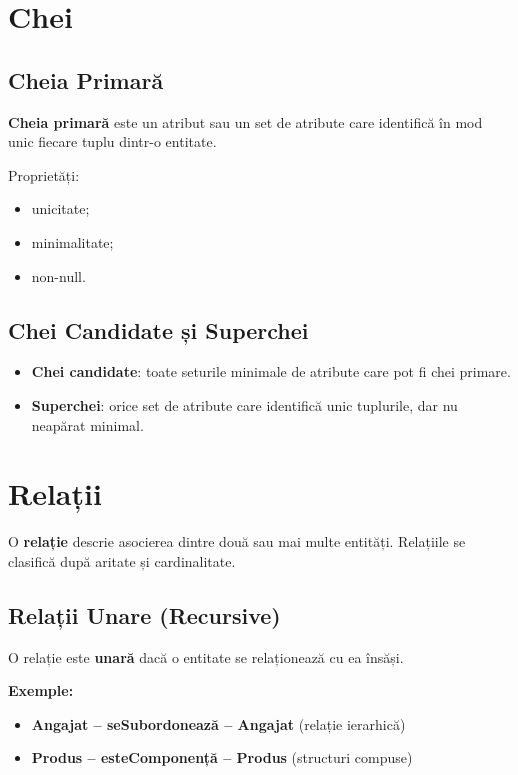 \documentclass[12pt,a4paper]{article}
\begin{document}
\section{Chei}
\subsection*{Cheia Primară}
\textbf{Cheia primară} este un atribut sau un set de atribute care identifică în mod
unic fiecare tuplu dintr-o entitate.

Proprietăți:
\begin{itemize}[noitemsep]
    \item unicitate;
    \item minimalitate;
    \item non-null.
\end{itemize}

\subsection*{Chei Candidate și Superchei}
\begin{itemize}[noitemsep]
    \item \textbf{Chei candidate}: toate seturile minimale de atribute care pot fi chei primare.
    \item \textbf{Superchei}: orice set de atribute care identifică unic tuplurile, dar nu neapărat minimal.
\end{itemize}

\section{Relații}
O \textbf{relație} descrie asocierea dintre două sau mai multe entități. Relațiile se clasifică după aritate și cardinalitate.

\subsection*{Relații Unare (Recursive)}
O relație este \textbf{unară} dacă o entitate se relaționează cu ea însăși.

\textbf{Exemple:}
\begin{itemize}[noitemsep]
    \item \textbf{Angajat -- seSubordonează -- Angajat} (relație ierarhică)
    \item \textbf{Produs -- esteComponență -- Produs} (structuri compuse)
\end{itemize}
\end{document}
